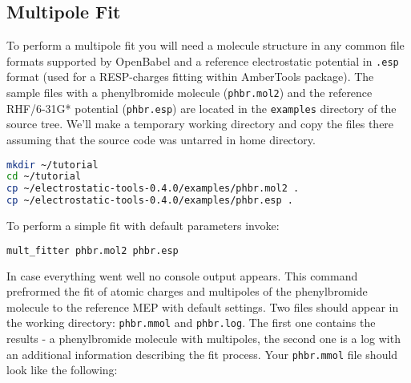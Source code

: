 \documentclass[10pt,a4paper]{article}
\begin{document}
\subsection{Multipole Fit}
To perform a multipole fit you will need a molecule structure in any common file formats
supported by OpenBabel and a reference electrostatic potential in \lstinline{.esp} 
format (used for a RESP-charges fitting within AmberTools package). 
The sample files with a phenylbromide molecule (\lstinline{phbr.mol2}) and the reference 
RHF/6-31G* potential 
(\lstinline{phbr.esp}) are located in the \lstinline{examples} directory of the source tree. 
We'll make a temporary working directory and copy the files there assuming that the 
source code was
untarred in home directory.
\begin{lstlisting}[language=bash]
mkdir ~/tutorial
cd ~/tutorial
cp ~/electrostatic-tools-0.4.0/examples/phbr.mol2 .
cp ~/electrostatic-tools-0.4.0/examples/phbr.esp .
\end{lstlisting}
To perform a simple fit with default parameters invoke:
\begin{lstlisting}[language=bash]
mult_fitter phbr.mol2 phbr.esp
\end{lstlisting}
In case everything went well no console output appears. This command prefrormed
the fit of atomic charges and multipoles of the phenylbromide molecule to the reference MEP 
with
default settings. Two files should appear in the working directory: \lstinline{phbr.mmol} 
and \lstinline{phbr.log}.
The first one contains the results - a phenylbromide molecule with multipoles, the second
one is a log with an additional information describing the fit process. 
Your \lstinline{phbr.mmol} file should look like the following:
\end{document}
